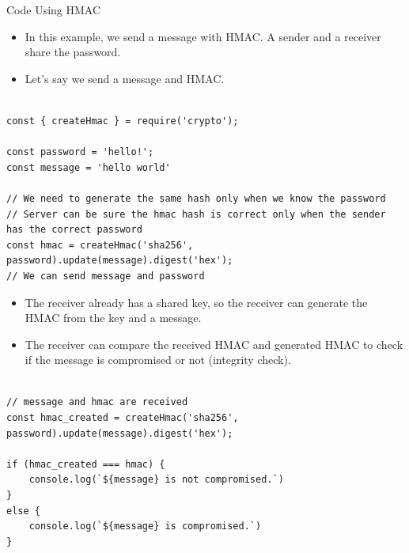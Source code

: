 \begin{frame}[fragile]{Code Using HMAC}

\begin{itemize}
	\item In this example, we send a message with HMAC. A sender and a receiver share the password.
	\item Let's say we send a message and HMAC.  
\end{itemize}

\begin{Code}{}%
\begin{lstlisting}[firstnumber=1, label=glabels, xleftmargin=0pt, basicstyle=\scriptsize]% 

const { createHmac } = require('crypto');

const password = 'hello!';
const message = 'hello world'

// We need to generate the same hash only when we know the password
// Server can be sure the hmac hash is correct only when the sender has the correct password 
const hmac = createHmac('sha256', password).update(message).digest('hex');
// We can send message and password
\end{lstlisting}%
\end{Code}%

\end{frame}

\begin{frame}[fragile]{}

\begin{itemize}
	\item The receiver already has a shared key, so the receiver can generate the HMAC from the key and a message. 
	\item The receiver can compare the received HMAC and generated HMAC to check if the message is compromised or not (integrity check). 
\end{itemize}

\begin{Code}{}%
\begin{lstlisting}[firstnumber=1, label=glabels, xleftmargin=0pt, basicstyle=\scriptsize]% 

// message and hmac are received
const hmac_created = createHmac('sha256', password).update(message).digest('hex');

if (hmac_created === hmac) {
    console.log(`${message} is not compromised.`)
}
else {
    console.log(`${message} is compromised.`)
}
\end{lstlisting}%
\end{Code}%

\end{frame}